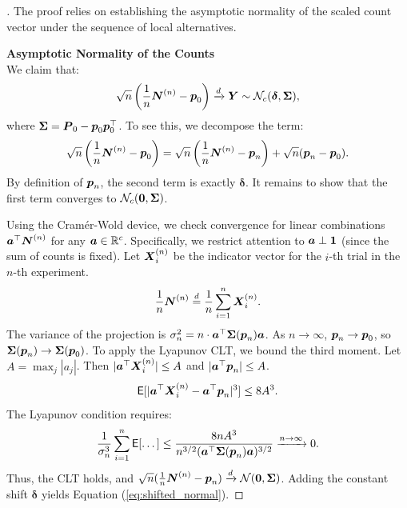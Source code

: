 \begin{proof}[]
The proof relies on establishing the asymptotic normality of the scaled count vector under the sequence of local alternatives.

\textbf{Asymptotic Normality of the Counts} \\
We claim that:
\begin{equation}
    \sqrt{n}\left(\frac{1}{n}\boldsymbol{N}^{(n)} - \boldsymbol{p}_0\right) \xrightarrow{d} \boldsymbol{Y} \sim \mathcal{N}_c(\boldsymbol{\delta}, \boldsymbol{\Sigma}), \label{eq:shifted_normal}
\end{equation}
where $\boldsymbol{\Sigma} = \boldsymbol{P}_0 - \boldsymbol{p}_0 \boldsymbol{p}_0^\top$.
To see this, we decompose the term:
\[
    \sqrt{n}\left(\frac{1}{n}\boldsymbol{N}^{(n)} - \boldsymbol{p}_0\right) = \sqrt{n}\left(\frac{1}{n}\boldsymbol{N}^{(n)} - \boldsymbol{p}_n\right) + \sqrt{n}(\boldsymbol{p}_n - \boldsymbol{p}_0).
\]
By definition of $\boldsymbol{p}_n$, the second term is exactly $\boldsymbol{\delta}$. It remains to show that the first term converges to $\mathcal{N}_c(\boldsymbol{0}, \boldsymbol{\Sigma})$.

Using the Cramér-Wold device, we check convergence for linear combinations $\boldsymbol{a}^\top \boldsymbol{N}^{(n)}$ for any $\boldsymbol{a} \in \mathbb{R}^c$. Specifically, we restrict attention to $\boldsymbol{a} \perp \boldsymbol{1}$ (since the sum of counts is fixed).
Let $\boldsymbol{X}_i^{(n)}$ be the indicator vector for the $i$-th trial in the $n$-th experiment.
\[
    \frac{1}{n}\boldsymbol{N}^{(n)} \overset{d}{=} \frac{1}{n}\sum\limits_{i=1}^n \boldsymbol{X}_i^{(n)}.
\]
The variance of the projection is $\sigma_n^2 = n \cdot \boldsymbol{a}^\top \boldsymbol{\Sigma}(\boldsymbol{p}_n) \boldsymbol{a}$. As $n \to \infty$, $\boldsymbol{p}_n \to \boldsymbol{p}_0$, so $\boldsymbol{\Sigma}(\boldsymbol{p}_n) \to \boldsymbol{\Sigma}(\boldsymbol{p}_0)$.
To apply the Lyapunov CLT, we bound the third moment. Let $A = \max_j |a_j|$. Then $|\boldsymbol{a}^\top \boldsymbol{X}_i^{(n)}| \le A$ and $|\boldsymbol{a}^\top \boldsymbol{p}_n| \le A$.
\[
    \mathsf{E}[|\boldsymbol{a}^\top \boldsymbol{X}_i^{(n)} - \boldsymbol{a}^\top \boldsymbol{p}_n|^3] \le 8A^3.
\]
The Lyapunov condition requires:
\[
    \frac{1}{\sigma_n^3} \sum\limits_{i=1}^n \mathsf{E}[\dots] \le \frac{8 n A^3}{n^{3/2} (\boldsymbol{a}^\top \boldsymbol{\Sigma}(\boldsymbol{p}_n)\boldsymbol{a})^{3/2}} \xrightarrow{n \to \infty} 0.
\]
Thus, the CLT holds, and $\sqrt{n}(\frac{1}{n}\boldsymbol{N}^{(n)} - \boldsymbol{p}_n) \xrightarrow{d} \mathcal{N}(\boldsymbol{0}, \boldsymbol{\Sigma})$. Adding the constant shift $\boldsymbol{\delta}$ yields Equation (\ref{eq:shifted_normal}).


\end{proof}
